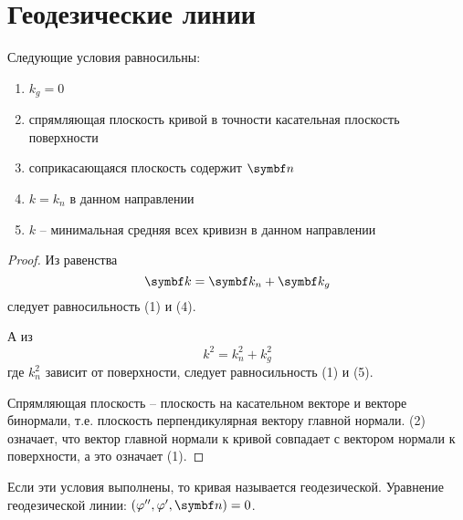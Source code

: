 \documentclass[main]{subfiles}
\begin{document}
\chapter{Геодезические линии}
\begin{theorem}
    Следующие условия равносильны:
    \begin{enumerate}
        \item $k_g = 0$
        \item спрямляющая плоскость кривой в точности касательная плоскость поверхности
        \item соприкасающаяся плоскость содержит $\vn$
        \item $k = k_n$ в данном направлении
        \item $k$ -- минимальная средняя всех кривизн в данном направлении
    \end{enumerate}
\end{theorem}
\begin{proof}
    Из равенства
    \[\vk = \vk_n + \vk_g\]
    следует равносильность (1) и (4).

    А из
    \[k^2 = k^2_n + k^2_g\]
    где $k^2_n$ зависит от поверхности, следует равносильность (1) и (5).

    Спрямляющая плоскость -- плоскость на касательном векторе и векторе бинормали,
    т.е. плоскость перпендикулярная вектору главной нормали.
    (2) означает, что вектор главной нормали к кривой совпадает с вектором нормали к поверхности, а это означает (1).
\end{proof}
\begin{definition}
    Если эти условия выполнены, то кривая называется геодезической.
    Уравнение геодезической линии: $(\phi'', \phi', \vn) = 0$.
\end{definition}
\end{document}
